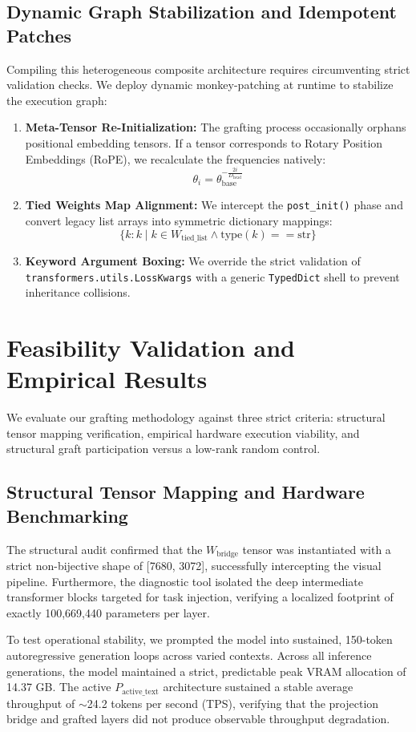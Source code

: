 \documentclass[11pt]{article}
\begin{document}
\subsection{Dynamic Graph Stabilization and Idempotent Patches}
Compiling this heterogeneous composite architecture requires circumventing strict validation checks. We deploy dynamic monkey-patching at runtime to stabilize the execution graph:
\begin{enumerate}
    \item \textbf{Meta-Tensor Re-Initialization:} The grafting process occasionally orphans positional embedding tensors. If a tensor corresponds to Rotary Position Embeddings (RoPE), we recalculate the frequencies natively:
    $$ \theta_i = \theta_{\text{base}}^{-\frac{2i}{D_{\text{head}}}} $$
    \item \textbf{Tied Weights Map Alignment:} We intercept the \texttt{post\_init()} phase and convert legacy list arrays into symmetric dictionary mappings:
    $$ \{k: k \mid k \in W_{\text{tied\_list}} \land \text{type}(k) == \text{str}\} $$
    \item \textbf{Keyword Argument Boxing:} We override the strict validation of \texttt{transformers.utils.LossKwargs} with a generic \texttt{TypedDict} shell to prevent inheritance collisions.
\end{enumerate}

\section{Feasibility Validation and Empirical Results}
We evaluate our grafting methodology against three strict criteria: structural tensor mapping verification, empirical hardware execution viability, and structural graft participation versus a low-rank random control.

\subsection{Structural Tensor Mapping and Hardware Benchmarking}
The structural audit confirmed that the $W_{\text{bridge}}$ tensor was instantiated with a strict non-bijective shape of [7680, 3072], successfully intercepting the visual pipeline. Furthermore, the diagnostic tool isolated the deep intermediate transformer blocks targeted for task injection, verifying a localized footprint of exactly 100,669,440 parameters per layer.

To test operational stability, we prompted the model into sustained, 150-token autoregressive generation loops across varied contexts. Across all inference generations, the model maintained a strict, predictable peak VRAM allocation of 14.37 GB. The active $P_{\text{active\_text}}$ architecture sustained a stable average throughput of $\sim$24.2 tokens per second (TPS), verifying that the projection bridge and grafted layers did not produce observable throughput degradation.
\end{document}

